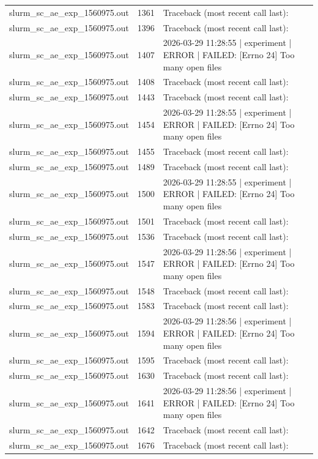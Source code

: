 \begin{tabular}{lrl}
slurm\_sc\_ae\_exp\_1560975.out & 1361 & Traceback (most recent call last): \\
slurm\_sc\_ae\_exp\_1560975.out & 1396 & Traceback (most recent call last): \\
slurm\_sc\_ae\_exp\_1560975.out & 1407 & 2026-03-29 11:28:55 | experiment | ERROR |   FAILED: [Errno 24] Too many open files \\
slurm\_sc\_ae\_exp\_1560975.out & 1408 & Traceback (most recent call last): \\
slurm\_sc\_ae\_exp\_1560975.out & 1443 & Traceback (most recent call last): \\
slurm\_sc\_ae\_exp\_1560975.out & 1454 & 2026-03-29 11:28:55 | experiment | ERROR |   FAILED: [Errno 24] Too many open files \\
slurm\_sc\_ae\_exp\_1560975.out & 1455 & Traceback (most recent call last): \\
slurm\_sc\_ae\_exp\_1560975.out & 1489 & Traceback (most recent call last): \\
slurm\_sc\_ae\_exp\_1560975.out & 1500 & 2026-03-29 11:28:55 | experiment | ERROR |   FAILED: [Errno 24] Too many open files \\
slurm\_sc\_ae\_exp\_1560975.out & 1501 & Traceback (most recent call last): \\
slurm\_sc\_ae\_exp\_1560975.out & 1536 & Traceback (most recent call last): \\
slurm\_sc\_ae\_exp\_1560975.out & 1547 & 2026-03-29 11:28:56 | experiment | ERROR |   FAILED: [Errno 24] Too many open files \\
slurm\_sc\_ae\_exp\_1560975.out & 1548 & Traceback (most recent call last): \\
slurm\_sc\_ae\_exp\_1560975.out & 1583 & Traceback (most recent call last): \\
slurm\_sc\_ae\_exp\_1560975.out & 1594 & 2026-03-29 11:28:56 | experiment | ERROR |   FAILED: [Errno 24] Too many open files \\
slurm\_sc\_ae\_exp\_1560975.out & 1595 & Traceback (most recent call last): \\
slurm\_sc\_ae\_exp\_1560975.out & 1630 & Traceback (most recent call last): \\
slurm\_sc\_ae\_exp\_1560975.out & 1641 & 2026-03-29 11:28:56 | experiment | ERROR |   FAILED: [Errno 24] Too many open files \\
slurm\_sc\_ae\_exp\_1560975.out & 1642 & Traceback (most recent call last): \\
slurm\_sc\_ae\_exp\_1560975.out & 1676 & Traceback (most recent call last): \\

\end{tabular}
